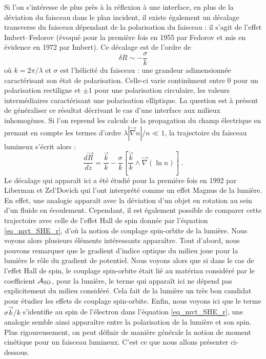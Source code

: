 \documentclass[a4paper,11pt]{article} %
\begin{document}
	Si l'on s'intéresse de plus près à la réflexion à une interface, en plus de la déviation du faisceau dans le plan incident, il existe également un décalage transverse du faisceau dépendant de la polarisation du faisceau : il s'agit de l'effet Imbert--Fedorov (évoqué pour la première fois en 1955 par Fedorov et mis en évidence en 1972 par Imbert). Ce décalage est de l'ordre de
	\begin{equation*}
		\delta R \sim - \frac{\sigma}{k}
	\end{equation*}
	où $ k= 2\pi / \lambda $ et $ \sigma $ est l'hélicité du faisceau : une grandeur adimensionnée caractérisant son état de polarisation. Celle-ci varie continûment entre 0 pour un polarisation rectiligne et $\pm 1 $ pour une polarisation circulaire, les valeurs intermédiaires caractérisant une polarisation elliptique. La question est à présent de généraliser ce résultat décrivant le cas d'une interface aux milieux inhomogènes. Si l'on reprend les calculs de la propagation du champ électrique en prenant en compte les termes d'ordre $ \lambda | \vec{\nabla}n | / n \ll 1$, la trajectoire du faisceau lumineux s'écrit alors :
	\begin{equation}
		\frac{d \vec{R}}{dz} = \frac{\vec{k}}{k} - \frac{\sigma}{k} \left[ \frac{\vec{k}}{k} \wedge \vec{\nabla}(\ln n) \right] \; .
	\end{equation}
	Le décalage qui apparaît ici a été étudié pour la première fois en 1992 par Liberman et Zel'Dovich qui l'ont interprété comme un effet Magnus de la lumière. En effet, une analogie apparaît avec la déviation d'un objet en rotation au sein d'un fluide en écoulement. Cependant, il est également possible de comparer cette trajectoire avec celle de l'effet Hall de spin donnée par l'équation \eqref{eq_mvt_SHE_r}, d'où la notion de couplage spin-orbite de la lumière. Nous voyons alors plusieurs éléments intéressants apparaître. Tout d'abord, nous pouvons remarquer que le gradient d'indice optique du milieu joue pour la lumière le rôle du gradient de potentiel. Nous voyons alors que si dans le cas de l'effet Hall de spin, le couplage spin-orbite était lié au matériau considéré par le coefficient $ \mathcal{A}_\textup{SO} $, pour la lumière, le terme qui apparaît ici ne dépend pas explicitement du milieu considéré. Cela fait de la lumière un très bon candidat pour étudier les effets de couplage spin-orbite. Enfin, nous voyons ici que le terme $ \sigma \vec{k} /k $ s'identifie au spin de l'électron dans l'équation \eqref{eq_mvt_SHE_r}, une analogie semble ainsi apparaître entre la polarisation de la lumière et son spin. Plus rigoureusement, on peut définir de manière générale la notion de moment cinétique pour un faisceau lumineux. C'est ce que nous allons présenter ci-dessous.
	
\end{document}
